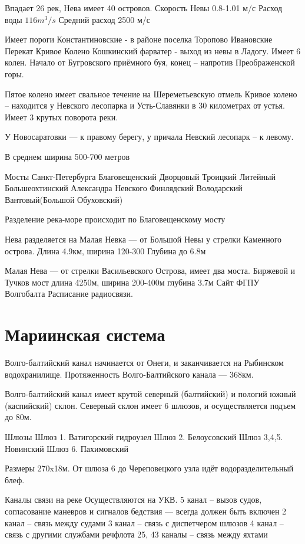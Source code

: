 \documentclass{article}        %
\begin{document}
Впадает 26 рек, Нева имеет 40 островов.
Скорость Невы 0.8-1.01 м/с
Расход воды $116m^3/s$
Средний расход 2500 м/с

Имеет пороги
	Константиновские - в районе поселка Торопово
	Ивановские
	Перекат Кривое Колено
	Кошкинский фарватер - выход из невы в Ладогу. Имеет 6 колен. Начало от Бугровского приёмного буя, конец -- напротив Преображенской горы.

Пятое колено имеет свальное течение на Шереметьевскую отмель
Кривое колено -- находится у Невского лесопарка и Усть-Славянки в 30 километрах от устья. Имеет 3 крутых поворота реки.

У Новосаратовки --- к правому берегу, у причала Невский лесопарк -- к левому.

В среднем ширина 500-700 метров

Мосты Санкт-Петербурга
	Благовещенский
	Дворцовый
	Троицкий
	Литейный
	Большеохтинский
	Александра Невского
	Финлядский
	Володарский
	Вантовый(Большой Обуховский)

Разделение река-море происходит по Благовещенскому мосту

Нева разделяется на
	Малая Невка --- от Большой Невы у стрелки Каменного острова. Длина 4.9км, ширина 120-300 
		Глубина до 6.8м
	
	Малая Нева --- от стрелки Васильевского Острова, имеет два моста. Биржевой и Тучков мост
		длина 4250м, 
		ширина 200-400м
		глубина 3.7м
Сайт ФГПУ Волгобалта
	Расписание радиосвязи.

\section{Мариинская система}
Волго-балтийский канал начинается от Онеги, и заканчивается на Рыбинском водохранилище. Протяженность Волго-Балтийского канала --- 368км.

Волго-балтийский канал имеет крутой северный (балтийский) и пологий южный (каспийский) склон.
Северный склон имеет 6 шлюзов, и осуществляется подъем до 80м.

Шлюзы
	Шлюз 1. Ватигорский гидроузел
	Шлюз 2. Белоусовский
	Шлюз 3,4,5. Новинский
	Шлюз 6. Пахимовский

Размеры 270x18м.
От шлюза 6 до Череповецкого узла идёт водоразделительный блеф.

Каналы связи на реке
Осуществляются на УКВ.
	5 канал -- вызов судов, согласование маневров и 
		сигналов бедствия --- всегда должен быть включен
	2 канал -- связь между судами
	3 канал -- связь с диспетчером шлюзов
	4 канал -- связь с другими службами речфлота
	25, 43 каналы -- связь между яхтами
\end{document}
